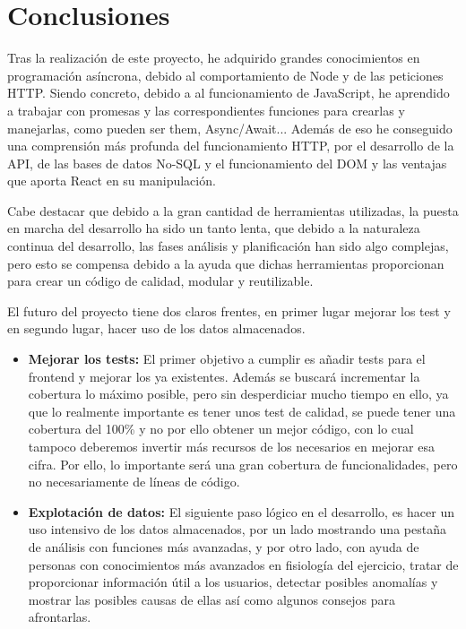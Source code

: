 \chapter{Conclusiones}

Tras la realización de este proyecto, he adquirido grandes conocimientos en programación asíncrona, debido al comportamiento de Node y de las peticiones HTTP. Siendo concreto, debido a al funcionamiento de JavaScript, he aprendido a trabajar con promesas y las correspondientes funciones para crearlas y manejarlas, como pueden ser them, Async/Await... Además de eso he conseguido una comprensión más profunda del funcionamiento HTTP, por el desarrollo de la API, de las bases de datos No-SQL y el funcionamiento del DOM y las ventajas que aporta React en su manipulación.

Cabe destacar que debido a la gran cantidad de herramientas utilizadas, la puesta en marcha del desarrollo ha sido un tanto lenta, que debido a la naturaleza continua del desarrollo, las fases análisis y planificación han sido algo complejas, pero esto se compensa debido a la ayuda que dichas herramientas proporcionan para crear un código de calidad, modular y reutilizable.

El futuro del proyecto tiene dos claros frentes, en primer lugar mejorar los test y en segundo lugar, hacer uso de los datos almacenados.
\begin{itemize}
  \item \textbf{Mejorar los tests: } El primer objetivo a cumplir es añadir tests para el frontend y mejorar los ya existentes. Además se buscará incrementar la cobertura lo máximo posible, pero sin desperdiciar mucho tiempo en ello, ya que lo realmente importante es tener unos test de calidad, se puede tener una cobertura del 100\% y no por ello obtener un mejor código, con lo cual tampoco deberemos invertir más recursos de los necesarios en mejorar esa cifra. Por ello, lo importante será una gran cobertura de funcionalidades, pero no necesariamente de líneas de código.
  \item \textbf{Explotación de datos: } El siguiente paso lógico en el desarrollo, es hacer un uso intensivo de los datos almacenados, por un lado mostrando una pestaña de análisis con funciones más avanzadas, y por otro lado, con ayuda de personas con conocimientos más avanzados en fisiología del ejercicio, tratar de proporcionar información útil a los usuarios, detectar posibles anomalías y mostrar las posibles causas de ellas así como algunos consejos para afrontarlas.
\end{itemize}

